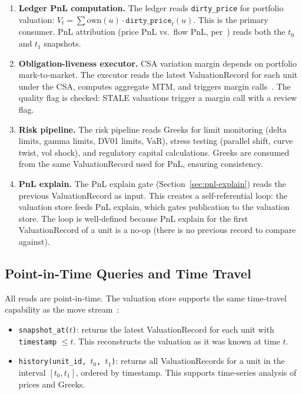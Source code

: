 \documentclass[11pt,a4paper]{article}
\begin{document}
\begin{enumerate}
\item \textbf{Ledger PnL computation.}  The ledger reads \texttt{dirty\_price} for portfolio valuation: $V_t = \sum \mathrm{own}(u) \cdot \texttt{dirty\_price}_t(u)$.  This is the primary consumer.  PnL attribution (price PnL vs.\ flow PnL, per~\cite[\S4.4]{ledger}) reads both the $t_0$ and $t_1$ snapshots.

\item \textbf{Obligation-liveness executor.}  CSA variation margin depends on portfolio mark-to-market.  The executor reads the latest ValuationRecord for each unit under the CSA, computes aggregate MTM, and triggers margin calls~\cite[\S14.4.4]{ledger}.  The quality flag is checked: STALE valuations trigger a margin call with a review flag.

\item \textbf{Risk pipeline.}  The risk pipeline reads Greeks for limit monitoring (delta limits, gamma limits, DV01 limits, VaR), stress testing (parallel shift, curve twist, vol shock), and regulatory capital calculations.  Greeks are consumed from the same ValuationRecord used for PnL, ensuring consistency.

\item \textbf{PnL explain.}  The PnL explain gate (Section~\ref{sec:pnl-explain}) reads the previous ValuationRecord as input.  This creates a self-referential loop: the valuation store feeds PnL explain, which gates publication to the valuation store.  The loop is well-defined because PnL explain for the first ValuationRecord of a unit is a no-op (there is no previous record to compare against).
\end{enumerate}

\subsection{Point-in-Time Queries and Time Travel}

All reads are point-in-time.  The valuation store supports the same time-travel capability as the move stream~\cite[\S1.2, Property~6]{ledger}:

\begin{itemize}[nosep]
\item \texttt{snapshot\_at($t$)}: returns the latest ValuationRecord for each unit with \texttt{timestamp} $\leq t$.  This reconstructs the valuation as it was known at time $t$.
\item \texttt{history(unit\_id, $t_0$, $t_1$)}: returns all ValuationRecords for a unit in the interval $[t_0, t_1]$, ordered by timestamp.  This supports time-series analysis of prices and Greeks.
\end{itemize}
\end{document}
